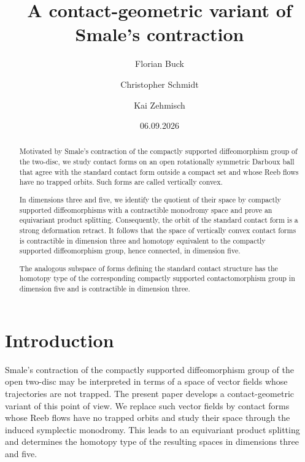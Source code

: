 \documentclass{amsart}
\theoremstyle{definition}
\begin{document}
\author{Florian Buck}
\author{Christopher Schmidt}
\author{Kai Zehmisch}
\address{Fakult\"at f\"ur Mathematik, Ruhr-Universit\"at Bochum,
Universit\"atsstra{\ss}e 150, D-44801 Bochum, Germany}


\title[A contact-geometric variant of Smale's contraction]
{A contact-geometric variant of Smale's contraction}


\date{06.09.2026}


\begin{abstract}
Motivated by Smale's contraction
of the compactly supported diffeomorphism group
of the two-disc,
we study contact forms
on an open rotationally symmetric Darboux ball
that agree with the standard contact form
outside a compact set
and whose Reeb flows have no trapped orbits.
Such forms are called vertically convex.

In dimensions three and five,
we identify the quotient of their space
by compactly supported diffeomorphisms
with a contractible monodromy space
and prove an equivariant product splitting.
Consequently,
the orbit of the standard contact form
is a strong deformation retract.
It follows that the space
of vertically convex contact forms
is contractible in dimension three
and homotopy equivalent
to the compactly supported diffeomorphism group,
hence connected,
in dimension five.

The analogous subspace of forms
defining the standard contact structure
has the homotopy type
of the corresponding compactly supported
contactomorphism group in dimension five
and is contractible in dimension three.
\end{abstract}




\maketitle




\section{Introduction\label{sec:intro}}


Smale's contraction \cite{sm59}
of the compactly supported diffeomorphism group
of the open two-disc
may be interpreted in terms of a space of vector fields
whose trajectories are not trapped.
The present paper develops
a contact-geometric variant of this point of view.
We replace such vector fields by contact forms
whose Reeb flows have no trapped orbits
and study their space
through the induced symplectic monodromy.
This leads to an equivariant product splitting
and determines the homotopy type
of the resulting spaces
in dimensions three and five.
\end{document}
